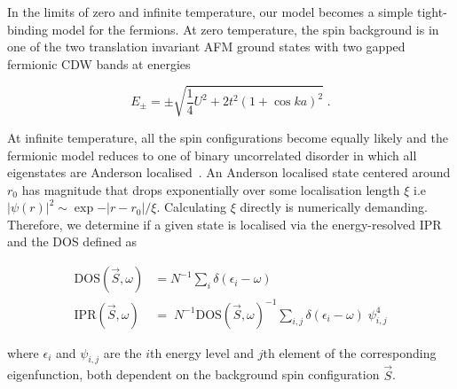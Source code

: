 In the limits of zero and infinite temperature, our model becomes a simple tight-binding model for the fermions. At zero temperature, the spin background is in one of the two translation invariant AFM ground states with two gapped fermionic CDW bands at energies

\[E_{\pm} = \pm\sqrt{\frac{1}{4}U^2 + 2t^2(1 + \cos ka)^2}\;.\]

At infinite temperature, all the spin configurations become equally likely and the fermionic model reduces to one of binary uncorrelated disorder in which all eigenstates are Anderson localised~\autocite{abrahamsScalingTheoryLocalization1979}. An Anderson localised state centered around \(r_0\) has magnitude that drops exponentially over some localisation length \(\xi\) i.e \(|\psi(r)|^2 \sim \exp{-|r - r_0|/\xi}\). Calculating \(\xi\) directly is numerically demanding. Therefore, we determine if a given state is localised via the energy-resolved IPR and the DOS defined as

\[\begin{aligned}
\mathrm{DOS}(\vec{S}, \omega)& = N^{-1} \sum_{i} \delta(\epsilon_i - \omega)\\
\mathrm{IPR}(\vec{S}, \omega)& = \; N^{-1} \mathrm{DOS}(\vec{S}, \omega)^{-1} \sum_{i,j} \delta(\epsilon_i - \omega)\;\psi^{4}_{i,j}\end{aligned}\]

where \(\epsilon_i\) and \(\psi_{i,j}\) are the \(i\)th energy level and \(j\)th element of the corresponding eigenfunction, both dependent on the background spin configuration \(\vec{S}\).

